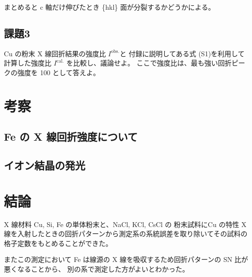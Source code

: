 \documentclass[11pt,dvipdfmx,a4paper]{jsarticle}
\begin{document}
まとめると c 軸だけ伸びたとき \{hkl\} 面が分裂するかどうかによる。

\subsection*{課題3}
Cu の粉末 X 線回折結果の強度比 \(I^{\text{obs.}}\)と
付録に説明してある式 (S1)を利用して計算した強度比 \(I^{\text{cal.}}\)
を比較し、議論せよ。
ここで強度比は、最も強い回折ピークの強度を 100 として答えよ。

\section{考察}
\subsection{Fe の X 線回折強度について}


\subsection{イオン結晶の発光}


\section{結論}
X 線材料 Cu, Si, Fe の単体粉末と、NaCl, KCl, CsCl の
粉末試料にCu の特性 X 線を入射したときの回折パターンから測定系の系統誤差を取り除いてその試料の格子定数をもとめることができた。

またこの測定において Fe は線源の X 線を吸収するため回折パターンの SN 比が悪くなることから、
別の系で測定した方がよいとわかった。




\end{document}
